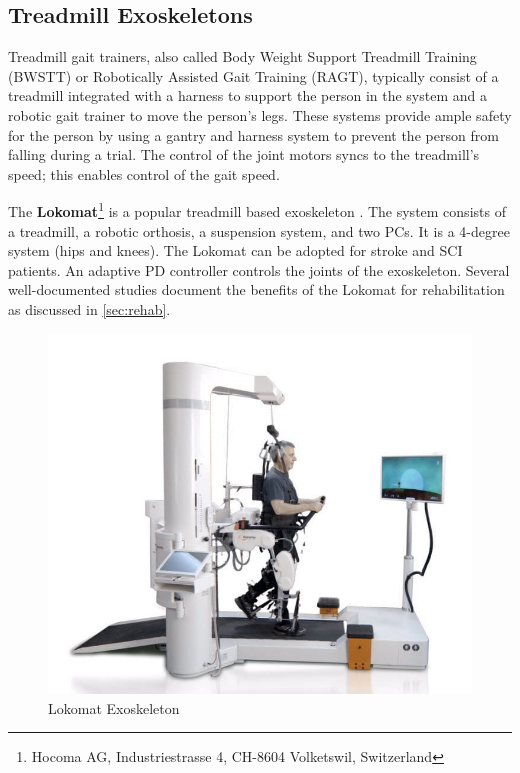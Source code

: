\subsection{Treadmill Exoskeletons}

Treadmill gait trainers, also called Body Weight Support Treadmill Training (BWSTT) or Robotically Assisted Gait Training (RAGT), typically consist of a treadmill integrated with a harness to support the person in the system and a robotic gait trainer to move the person's legs. These systems provide ample safety for the person by using a gantry and harness system to prevent the person from falling during a trial. The control of the joint motors syncs to the treadmill's speed; this enables control of the gait speed.
 
The \textbf{Lokomat}\footnote{Hocoma AG, Industriestrasse 4, CH-8604 Volketswil, Switzerland } is a popular treadmill based exoskeleton \cite{jezernik2003robotic}. The system consists of a treadmill, a robotic orthosis, a suspension system, and two PCs. It is a 4-degree system (hips and knees). The Lokomat can be adopted for stroke and SCI patients. An adaptive PD controller controls the joints of the exoskeleton. Several well-documented studies document the benefits of the Lokomat for rehabilitation as discussed in \autoref{sec:rehab}.
 
 
\begin{figure}[H]
    \centering
    \includegraphics[scale=0.25]{images/background/loko.jpg}
    \caption[Lokomat Exoskeleton]{Lokomat Exoskeleton}
    \label{fig:loko}
\end{figure} 
 

